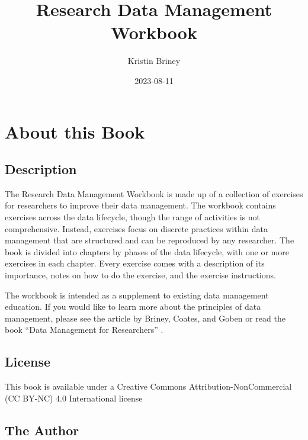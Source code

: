 \documentclass[
]{book}
\title{Research Data Management Workbook}
\author{Kristin Briney}
\date{2023-08-11}
\begin{document}
\maketitle

{
\setcounter{tocdepth}{1}
\tableofcontents
}
\hypertarget{about-this-book}{%
\chapter*{About this Book}\label{about-this-book}}

\hypertarget{description}{%
\section*{Description}\label{description}}

The Research Data Management Workbook is made up of a collection of exercises for researchers to improve their data management. The workbook contains exercises across the data lifecycle, though the range of activities is not comprehensive. Instead, exercises focus on discrete practices within data management that are structured and can be reproduced by any researcher. The book is divided into chapters by phases of the data lifecycle, with one or more exercises in each chapter. Every exercise comes with a description of its importance, notes on how to do the exercise, and the exercise instructions.

The workbook is intended as a supplement to existing data management education. If you would like to learn more about the principles of data management, please see the article by Briney, Coates, and Goben \citet{briney_foundational_2020} or read the book ``Data Management for Researchers'' \citet{briney_data_2015}.

\hypertarget{license}{%
\section*{License}\label{license}}

This book is available under a Creative Commons Attribution-NonCommercial (CC BY-NC) 4.0 International license

\hypertarget{the-author}{%
\section*{The Author}\label{the-author}}
\end{document}
